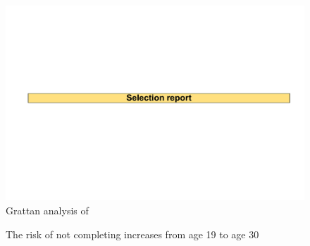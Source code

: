                \begin{figure}
                    \caption{The risk of not completing increases from age 19 to age 30\label{fig:19}}%
                    \includegraphics[page=24]{atlas/selection_chartdeck.pdf} 
                    {Grattan analysis of \textcite{DepartmentofEducationandTraininga}}
                \end{figure}

